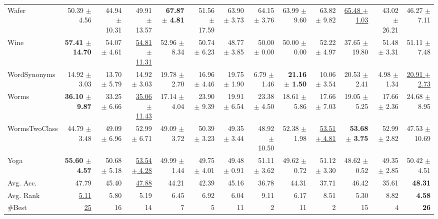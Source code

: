 \begin{landscape}
\begin{longtable}{lrrrrrrrrrrrr}
Wafer & 50.39 $\pm$ 4.56 & 44.94 $\pm$ 10.31 & 49.91 $\pm$ 13.57 & \textbf{67.87 $\pm$ 4.81} & 51.56 $\pm$ 17.59 & 63.90 $\pm$ 3.73 & 64.15 $\pm$ 3.76 & 63.99 $\pm$ 9.60 & 63.82 $\pm$ 9.82 & \underline{65.48 $\pm$ 1.03} & 43.02 $\pm$ 26.21 & 46.27 $\pm$ 7.11 \\
Wine & \textbf{57.41 $\pm$ 14.70} & 54.07 $\pm$ 4.61 & \underline{54.81 $\pm$ 11.31} & 52.96 $\pm$ 8.34 & 50.74 $\pm$ 6.23 & 48.77 $\pm$ 3.85 & 50.00 $\pm$ 0.00 & 50.00 $\pm$ 0.00 & 52.22 $\pm$ 4.97 & 37.65 $\pm$ 19.80 & 51.48 $\pm$ 3.31 & 51.11 $\pm$ 7.48 \\
WordSynonyms & 14.92 $\pm$ 3.03 & 13.70 $\pm$ 5.79 & 14.92 $\pm$ 3.03 & 19.78 $\pm$ 2.70 & 16.96 $\pm$ 4.46 & 19.75 $\pm$ 1.90 & 6.79 $\pm$ 1.46 & \textbf{21.16 $\pm$ 1.50} & 10.06 $\pm$ 3.54 & 20.53 $\pm$ 2.41 & 4.98 $\pm$ 1.34 & \underline{20.91 $\pm$ 2.73} \\
Worms & \textbf{36.10 $\pm$ 9.87} & 33.25 $\pm$ 6.66 & \underline{35.06 $\pm$ 11.43} & 17.14 $\pm$ 4.04 & 23.90 $\pm$ 9.39 & 19.91 $\pm$ 6.54 & 23.38 $\pm$ 4.50 & 18.61 $\pm$ 5.86 & 17.66 $\pm$ 7.03 & 19.05 $\pm$ 5.25 & 17.66 $\pm$ 2.36 & 24.68 $\pm$ 8.95 \\
WormsTwoClass & 44.79 $\pm$ 3.48 & 49.09 $\pm$ 6.96 & 52.99 $\pm$ 6.71 & 49.09 $\pm$ 3.72 & 50.39 $\pm$ 3.23 & 49.35 $\pm$ 3.44 & 48.92 $\pm$ 10.50 & 52.38 $\pm$ 1.98 & \underline{53.51 $\pm$ 4.81} & \textbf{53.68 $\pm$ 3.75} & 52.99 $\pm$ 2.82 & 47.53 $\pm$ 10.69 \\
Yoga & \textbf{55.60 $\pm$ 4.57} & 50.68 $\pm$ 5.18 & \underline{53.54 $\pm$ 4.28} & 49.99 $\pm$ 1.44 & 49.75 $\pm$ 4.01 & 49.48 $\pm$ 0.91 & 51.11 $\pm$ 3.62 & 49.62 $\pm$ 0.72 & 51.12 $\pm$ 3.30 & 48.62 $\pm$ 0.52 & 49.35 $\pm$ 2.85 & 50.42 $\pm$ 4.51 \\
\midrule
Avg. Acc. & 47.79 & 45.40 & \underline{47.88} & 44.21 & 42.39 & 45.16 & 36.78 & 44.31 & 37.71 & 46.42 & 35.61 & \textbf{48.31} \\
Avg. Rank & \underline{5.11} & 5.80 & 5.19 & 6.45 & 6.92 & 6.04 & 9.11 & 6.17 & 8.51 & 5.30 & 8.82 & \textbf{4.58} \\
\#Best & \underline{25} & 16 & 14 & 7 & 5 & 11 & 2 & 11 & 2 & 15 & 4 & \textbf{26} \\
\end{longtable}
\endgroup
\end{landscape}
